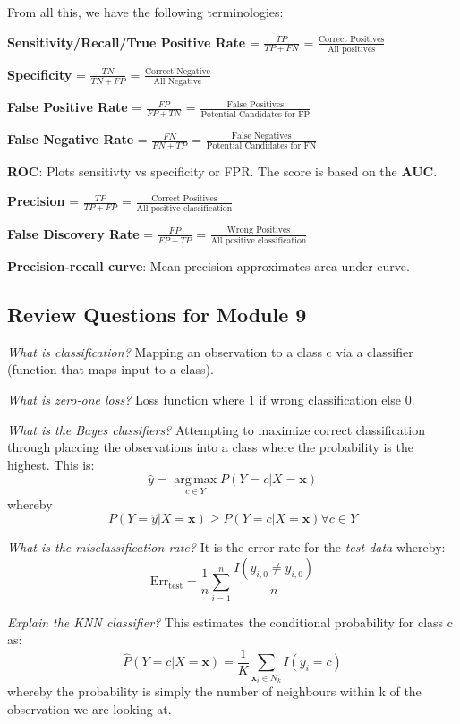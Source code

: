 \documentclass[11pt, oneside]{article}
\theoremstyle{definition}
\DeclareMathOperator*{\argmax}{arg\,max}
\begin{document}
From all this, we have the following terminologies:
\begin{center}
\textbf{Sensitivity/Recall/True Positive Rate} = $\frac{TP}{TP+FN}$ = $\frac{\text{Correct Positives}}{\text{All positives}}$

\textbf{Specificity} = $\frac{TN}{TN+FP}$ = $\frac{\text{Correct Negative}}{{\text{All Negative}}}$

\textbf{False Positive Rate} = $\frac{FP}{FP+TN}$ = $\frac{\text{False Positives}}{{\text{Potential Candidates for FP}}}$

\textbf{False Negative Rate} = $\frac{FN}{FN+TP}$ = $\frac{\text{False Negatives}}{{\text{Potential Candidates for FN}}}$

\textbf{ROC}: Plots sensitivty vs specificity or FPR. The score is based on the \textbf{AUC}.


\textbf{Precision} = $\frac{TP}{TP+FP}$ = $\frac{\text{Correct Positives}}{\text{All positive classification}}$

\textbf{False Discovery Rate} = $\frac{FP}{FP+TP}$ = $\frac{\text{Wrong Positives}}{\text{All positive classification}}$

\textbf{Precision-recall curve}: Mean precision approximates area under curve.
\end{center}
\subsection{Review Questions for Module 9}
\textit{What is classification?}
Mapping an observation to a class c via a classifier (function that maps input to a class).

\textit{What is zero-one loss?} Loss function where 1 if wrong classification else 0.

\textit{What is the Bayes classifiers?} Attempting to maximize correct classification through placcing the observations into a class where the probability is the highest. This is:
$$
\hat{y} = \argmax\limits_{c \in Y}P(Y=c|X=\bm{x})
$$
whereby
$$
P(Y = \hat{y}|X = \bm{x}) \geq P(Y=c|X=\bm{x}) \forall c \in Y
$$

\textit{What is the misclassification rate?} It is the error rate for the \textit{test data} whereby:
$$
\bar{\text{Err}}_{\text{test}} = \frac{1}{n}\sum\limits_{i=1}^n\frac{I(y_{i,0} \neq \hat{y}_{i,0})}{n}
$$

\textit{Explain the KNN classifier?} This estimates the conditional probability for class c as:
$$
\hat{P}(Y=c|X=\bm{x}) = \frac{1}{K}\sum\limits_{\bm{x}_i \in N_k}I(y_i=c)
$$
whereby the probability is simply the number of neighbours within k of the observation we are looking at.
\end{document}
